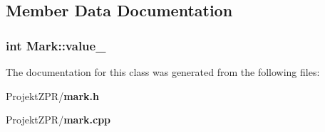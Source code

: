 \subsection{Member Data Documentation}
\subsubsection[{value\-\_\-}]{\setlength{\rightskip}{0pt plus 5cm}int Mark\-::value\-\_\-\hspace{0.3cm}{\ttfamily [private]}}\label{class_mark_ae08ef0c88b83b05f010aaad4e974f3f7}


The documentation for this class was generated from the following files\-:\begin{DoxyCompactItemize}
\item 
Projekt\-Z\-P\-R/{\bf mark.\-h}\item 
Projekt\-Z\-P\-R/{\bf mark.\-cpp}\end{DoxyCompactItemize}
